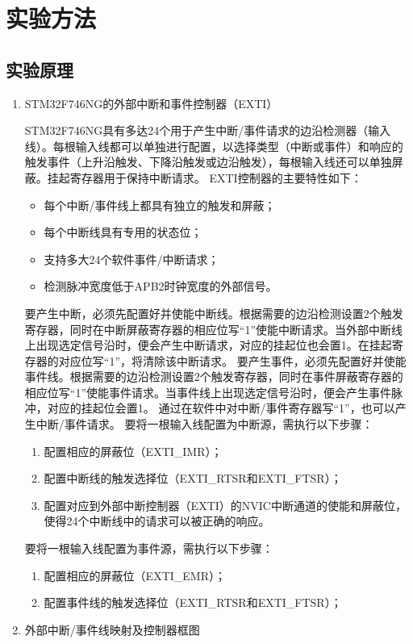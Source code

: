 ﻿\documentclass[UTF8,12pt]{article}
\begin{document}
\section{实验方法}
\subsection{实验原理}
\begin{enumerate}
  \item STM32F746NG的外部中断和事件控制器（EXTI）
  
  STM32F746NG具有多达24个用于产生中断/事件请求的边沿检测器（输入线）。每根输入线都可以单独进行配置，以选择类型（中断或事件）和响应的触发事件（上升沿触发、下降沿触发或边沿触发），每根输入线还可以单独屏蔽。挂起寄存器用于保持中断请求。
  EXTI控制器的主要特性如下：
  \begin{itemize}
    \item 每个中断/事件线上都具有独立的触发和屏蔽；
    \item 每个中断线具有专用的状态位；
    \item 支持多大24个软件事件/中断请求；
    \item 检测脉冲宽度低于APB2时钟宽度的外部信号。
  \end{itemize}
  要产生中断，必须先配置好并使能中断线。根据需要的边沿检测设置2个触发寄存器，同时在中断屏蔽寄存器的相应位写“1”使能中断请求。当外部中断线上出现选定信号沿时，便会产生中断请求，对应的挂起位也会置1。在挂起寄存器的对应位写“1”，将清除该中断请求。
  要产生事件，必须先配置好并使能事件线。根据需要的边沿检测设置2个触发寄存器，同时在事件屏蔽寄存器的相应位写“1”使能事件请求。当事件线上出现选定信号沿时，便会产生事件脉冲，对应的挂起位会置1。
  通过在软件中对中断/事件寄存器写“1”，也可以产生中断/事件请求。
  要将一根输入线配置为中断源，需执行以下步骤：
  \begin{enumerate}
    \item 配置相应的屏蔽位（EXTI\_IMR）；
    \item 配置中断线的触发选择位（EXTI\_RTSR和EXTI\_FTSR）；
    \item 配置对应到外部中断控制器（EXTI）的NVIC中断通道的使能和屏蔽位，使得24个中断线中的请求可以被正确的响应。
  \end{enumerate}
  要将一根输入线配置为事件源，需执行以下步骤：
  \begin{enumerate}
    \item 配置相应的屏蔽位（EXTI\_EMR）；
    \item 配置事件线的触发选择位（EXTI\_RTSR和EXTI\_FTSR）；
  \end{enumerate}
  \item 外部中断/事件线映射及控制器框图
  

\end{enumerate}
\end{document}
